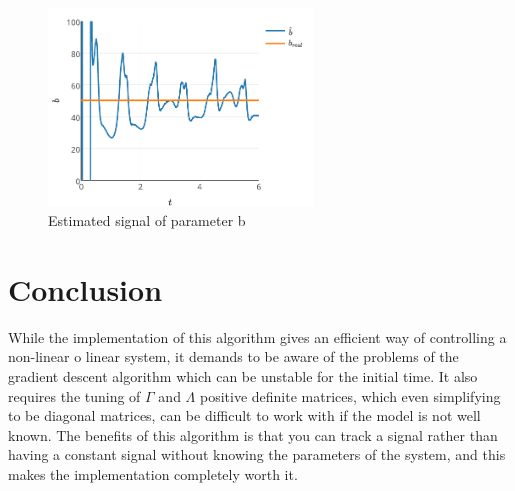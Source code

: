 \documentclass[journal]{IEEEtran}
\begin{document}
    \begin{figure}[!t]
        \centering
        \includegraphics[width=7cm]{parametrob}
        \caption{Estimated signal of parameter b}
        \label{fig_parametrob}
    \end{figure}

\section{Conclusion}
    While the implementation of this algorithm gives an efficient way of controlling a non-linear o linear system, it demands to be aware of the problems of the gradient descent algorithm which can be unstable for the initial time. It also requires the tuning of $\Gamma$ and $\Lambda$ positive definite matrices, which even simplifying to be diagonal matrices, can be difficult to work with if the model is not well known. The benefits of this algorithm is that you can track a signal rather than having a constant signal without knowing the parameters of the system, and this makes the implementation completely worth it.

\newpage




\end{document}
